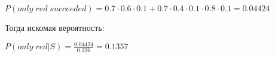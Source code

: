 \documentclass[addpoints]{exam} %
\begin{document}
\begin{questions}
\begin{parts}
\begin{solution}
$P(only \; red \; succeeded) = 0.7 \cdot 0.6 \cdot 0.1 + 0.7 \cdot 0.4 \cdot 0.1 \cdot 0.8 \cdot 0.1 =  0.04424$

Тогда искомая вероятность:

$P(only \; red | S) = \frac{0.04424}{0.326} =  0.1357$


\end{solution}


\end{parts}

%
%
%
%
%
%
%
%
%
%
%
%
%
%
%
%
%



\end{questions}
\end{document}
